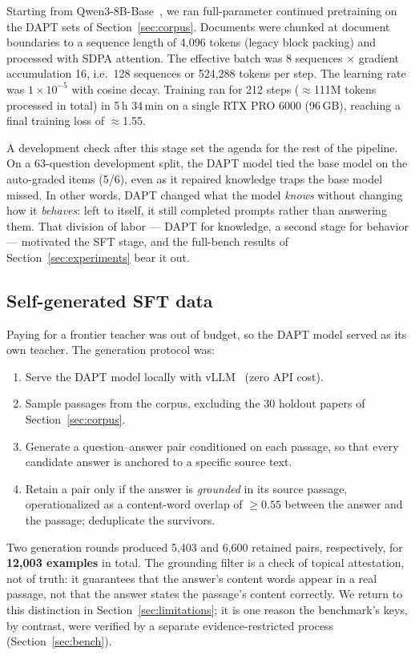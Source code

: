 \documentclass[11pt]{article}
\begin{document}
Starting from Qwen3-8B-Base~\cite{qwen3}, we ran full-parameter continued
pretraining on the DAPT sets of Section~\ref{sec:corpus}. Documents were
chunked at document boundaries to a sequence length of 4,096 tokens
(legacy block packing) and processed with SDPA attention. The effective
batch was 8 sequences $\times$ gradient accumulation 16, i.e.\ 128
sequences or 524,288 tokens per step. The learning rate was
$1\times10^{-5}$ with cosine decay. Training ran for 212 steps
($\approx$111M tokens processed in total) in 5\,h 34\,min on a single
RTX PRO 6000 (96\,GB), reaching a final training loss of $\approx$1.55.

A development check after this stage set the agenda for the rest of the
pipeline. On a 63-question development split, the DAPT model tied the base
model on the auto-graded items (5/6), even as it repaired knowledge traps
the base model missed. In other words, DAPT changed what the model
\emph{knows} without changing how it \emph{behaves}: left to itself, it
still completed prompts rather than answering them. That division of labor
--- DAPT for knowledge, a second stage for behavior --- motivated the SFT
stage, and the full-bench results of Section~\ref{sec:experiments} bear
it out.

\subsection{Self-generated SFT data}
\label{sec:sft-data}

Paying for a frontier teacher was out of budget, so the DAPT model served
as its own teacher. The generation protocol was:
\begin{enumerate}
\item Serve the DAPT model locally with vLLM~\cite{vllm} (zero API cost).
\item Sample passages from the corpus, excluding the 30 holdout papers of
Section~\ref{sec:corpus}.
\item Generate a question--answer pair conditioned on each passage, so
that every candidate answer is anchored to a specific source text.
\item Retain a pair only if the answer is \emph{grounded} in its source
passage, operationalized as a content-word overlap of $\geq 0.55$ between
the answer and the passage; deduplicate the survivors.
\end{enumerate}
Two generation rounds produced 5,403 and 6,600 retained pairs,
respectively, for \textbf{12,003 examples} in total. The grounding filter
is a check of topical attestation, not of truth: it guarantees that the
answer's content words appear in a real passage, not that the answer
states the passage's content correctly. We return to this distinction in
Section~\ref{sec:limitations}; it is one reason the benchmark's keys, by
contrast, were verified by a separate evidence-restricted process
(Section~\ref{sec:bench}).
\end{document}
